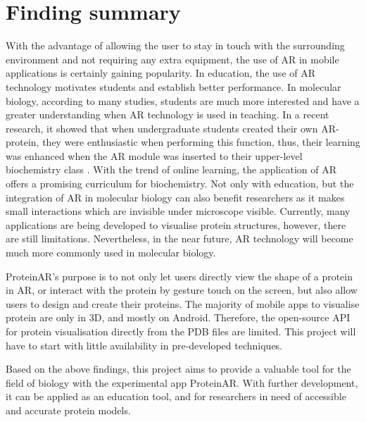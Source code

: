 \section{Finding summary}
With the advantage of allowing the user to stay in touch with the surrounding environment and not requiring any extra equipment, the use of AR in mobile applications is certainly gaining popularity. In education, the use of AR technology motivates students and establish better performance. In molecular biology, according to many studies, students are much more interested and have a greater understanding when AR technology is used in teaching. In a recent research, it showed that when undergraduate students created their own AR-protein, they were enthusiastic when performing this function, thus, their learning was enhanced when the AR module was inserted to their upper-level biochemistry class \parencite{argu_fast_2020}. With the trend of online learning, the application of AR offers a promising curriculum for biochemistry. Not only with education, but the integration of AR in molecular biology can also benefit researchers as it makes small interactions which are invisible under microscope visible. Currently, many applications are being developed to visualise protein structures, however, there are still limitations. Nevertheless, in the near future, AR technology will become much more commonly used in molecular biology. 

ProteinAR's purpose is to not only let users directly view the shape of a protein in AR, or interact with the protein by gesture touch on the screen, but also allow users to design and create their proteins. The majority of mobile apps to visualise protein are only in 3D, and mostly on Android. Therefore, the open-source API for protein visualisation directly from the PDB files are limited. This project will have to start with little availability in pre-developed techniques.

Based on the above findings, this project aims to provide a valuable tool for the field of biology with the experimental app ProteinAR. With further development, it can be applied as an education tool, and for researchers in need of accessible and accurate protein models.





